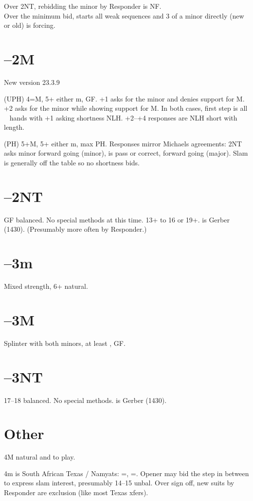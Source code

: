 \documentclass[main]{subfiles}
\begin{document}
\begin{info}
	Over 2NT, rebidding the minor by Responder is NF. \\
	Over the  minimum bid,  starts all weak sequences and 3 of a minor directly (new or old) is forcing.
\end{info}

\section[1D--2M]{--2M}

	\begin{info}
		New version 23.3.9
	\end{info}

	(UPH) 4=M, 5+ either m, GF. +1 asks for the minor and denies support for M. +2 asks for the minor while showing support for M. In both cases, first step is all \ccc~ hands with +1 asking shortness NLH. +2--+4 responses are NLH short with \ddd~ length.
	
	(PH) 5+M, 5+ either m, max PH.  Responses mirror Michaels agreements:  2NT asks minor forward going (minor),  is pass or correct,  forward going (major).  Slam is generally off the table so no shortness bids.
	 
\section[1D--2NT]{--2NT}

GF balanced. No special methods at this time. 13+ to 16 or 19+.   is Gerber (1430).  (Presumably more often by Responder.)

\section[1D--3m]{--3m}

Mixed strength, 6+ natural.

\section[1D--3M]{--3M}

Splinter with both minors, at least , GF.

\section[1D--3NT]{--3NT}

17--18 balanced. No special methods.  is Gerber (1430).

\section{Other}

4M natural and to play.

4m is South African Texas / Namyats:  =\hhh, =\sss.  Opener may bid the step in between to express slam interest, presumably 14--15 unbal.  Over sign off, new suits by Responder are exclusion (like most Texas xfers).   
\end{document}
